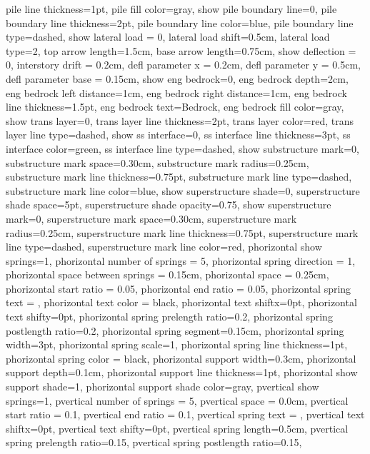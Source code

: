 {{  pile line thickness=1pt,
  pile fill color=gray,
  show pile boundary line=0,
  pile boundary line thickness=2pt,
  pile boundary line color=blue,
  pile boundary line type=dashed,
  show lateral load = 0,
  lateral load shift=0.5cm,
  lateral load type=2,
  top arrow length=1.5cm,
  base arrow length=0.75cm,
  show deflection = 0, 
  interstory drift = 0.2cm,
  defl parameter x = 0.2cm,
  defl parameter y = 0.5cm,
  defl parameter base = 0.15cm,
  show eng bedrock=0,
  eng bedrock depth=2cm,
  eng bedrock left distance=1cm,
  eng bedrock right distance=1cm,
  eng bedrock line thickness=1.5pt,
  eng bedrock text=Bedrock,
  eng bedrock fill color=gray,
  show trans layer=0,
  trans layer line thickness=2pt,
  trans layer color=red,
  trans layer line type=dashed,
  show ss interface=0,
  ss interface line thickness=3pt,
  ss interface color=green,
  ss interface line type=dashed,
  show substructure mark=0,
  substructure mark space=0.30cm,
  substructure mark radius=0.25cm,
  substructure mark line thickness=0.75pt,
  substructure mark line type=dashed,
  substructure mark line color=blue,
  show superstructure shade=0,
  superstructure shade space=5pt,
  superstructure shade opacity=0.75,
  show superstructure mark=0,
  superstructure mark space=0.30cm,
  superstructure mark radius=0.25cm,
  superstructure mark line thickness=0.75pt,
  superstructure mark line type=dashed,
  superstructure mark line color=red,
  phorizontal show springs=1,
  phorizontal number of springs = 5,
  phorizontal spring direction = 1,
  phorizontal space between springs = 0.15cm,
  phorizontal space = 0.25cm,
  phorizontal start ratio = 0.05,
  phorizontal end ratio = 0.05,
  phorizontal spring text = {},
  phorizontal text color = black,
  phorizontal text shiftx=0pt,
  phorizontal text shifty=0pt,
  phorizontal spring prelength ratio=0.2,
  phorizontal spring postlength ratio=0.2,
  phorizontal spring segment=0.15cm,
  phorizontal spring width=3pt,
  phorizontal spring scale=1,
  phorizontal spring line thickness=1pt,
  phorizontal spring color = black,
  phorizontal support width=0.3cm,
  phorizontal support depth=0.1cm,
  phorizontal support line thickness=1pt,
  phorizontal show support shade=1,
  phorizontal support shade color=gray,
  pvertical show springs=1,
  pvertical number of springs = 5,
  pvertical space = 0.0cm,
  pvertical start ratio = 0.1,
  pvertical end ratio = 0.1,
  pvertical spring text = {},
  pvertical text shiftx=0pt,
  pvertical text shifty=0pt,
  pvertical spring length=0.5cm,
  pvertical spring prelength ratio=0.15,
  pvertical spring postlength ratio=0.15,
}}
